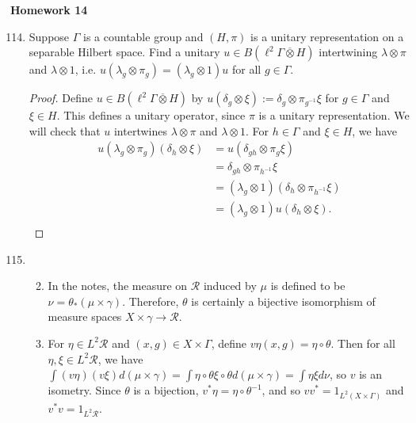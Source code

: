 \documentclass[a4paper,10pt]{report}
\newcommand{\ol}[1]{\overline{#1}}
\begin{document}

\pagestyle{fancy}	
\fancyhf{} %
\setlength{\headheight}{60pt}

\begin{center}
	\textbf{Homework 14}
\end{center}
\begin{enumerate}
		\setcounter{enumi}{113}
	\item Suppose $\Gamma$ is a countable group and $(H, \pi)$ is a unitary representation
		on a separable Hilbert space.
		Find a unitary $u \in B(\ell^2\Gamma \ol{\otimes} H)$ intertwining $\lambda \otimes \pi$
		and $\lambda \otimes 1$, i.e. $u(\lambda_g \otimes \pi_g) = (\lambda_g \otimes 1)u$
		for all $g \in \Gamma$.
		\begin{proof}
			Define $u \in B(\ell^2\Gamma \ol{\otimes} H)$ by
			$u(\delta_g \otimes \xi) := \delta_g \otimes \pi_{g^{-1}}\xi$
			for $g \in \Gamma$ and $\xi \in H$.
			This defines a unitary operator, since $\pi$ is a unitary representation.
			We will check that $u$ intertwines $\lambda \otimes \pi$ and $\lambda \otimes 1$.
			For $h \in \Gamma$ and $\xi \in H$, we have
			\begin{align*}
				u(\lambda_g \otimes \pi_g)(\delta_h \otimes \xi)
				 & = u(\delta_{gh} \otimes \pi_g\xi) \\
				 & = \delta_{gh} \otimes \pi_{h^{-1}}\xi \\
				 & = (\lambda_g \otimes 1)(\delta_h \otimes \pi_{h^{-1}}\xi) \\
				 & = (\lambda_g \otimes 1)u(\delta_h \otimes \xi). \\
			\end{align*}
		\end{proof}
	\item 
		\begin{enumerate}
				\setcounter{enumii}{1}
			\item In the notes, the measure on $\mathcal{R}$ induced by $\mu$ is defined to be $\nu=\theta_*(\mu\times\gamma)$. Therefore, $\theta$ is certainly a bijective isomorphism of measure spaces $X\times\gamma\to\mathcal{R}$. 
				\setcounter{enumii}{0}
			\item For $\eta\in L^2\mathcal{R}$ and $(x,g)\in X\times\Gamma$, define $v\eta(x,g)=\eta\circ\theta$. Then for all $\eta,\xi\in L^2\mathcal{R}$, we have $\int(v\eta)(v\xi)d(\mu\times\gamma)=\int\eta\circ\theta\xi\circ\theta d(\mu\times\gamma)=\int\eta\xi d\nu$, so $v$ is an isometry. Since $\theta$ is a bijection, $v^*\eta=\eta\circ\theta^{-1}$, and so $vv^*=1_{L^2(X\times\Gamma)}$ and $v^*v=1_{L^2\mathcal{R}}$. 

\end{enumerate}
\end{enumerate}
\end{document}
